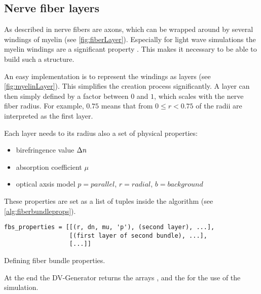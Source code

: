 \subsection{Nerve fiber layers}
%
As described in \dummy{} nerve fibers are axons, which can be wrapped around by several windings of myelin (see \cref{fig:fiberLayer}).
Especially for light wave simulations the myelin windings are a significant property \cite{MenzelDissertation}.
This makes it necessary to be able to build such a structure.
\par
%
An easy implementation is to represent the windings as layers (see \cref{fig:myelinLayer}).
This simplifies the creation process significantly.
A layer can then simply defined by a factor between $0$ and $1$, which scales with the nerve fiber radius.
For example, $0.75$ means that from $0 \leq r < 0.75$ of the radii are interpreted as the first layer.
\par
%
Each layer needs to its radius also a set of physical properties:
%
\begin{itemize}[nosep]
    \item birefringence value $\textnormal{$\Delta n$}$
    \item absorption coefficient $\mu$
    \item optical axsis model $p=\mathit{parallel}$, $r=\mathit{radial}$, $b=\mathit{background}$
\end{itemize}
%
These properties are set as a list of tuples inside the algorithm (see \cref{alg:fiberbundleprops}).
%
\begin{lstfloat}[!ht]
\lstset{style=python}
\begin{lstlisting}[]
fbs_properties = [[(r, dn, mu, 'p'), (second layer), ...],
                  [(first layer of second bundle), ...],
                  [...]]
\end{lstlisting}
\caption[Fiber bundle properties]{Defining fiber bundle properties.}
\label{alg:fiberbundleprops}
\end{lstfloat}
%
At the end the DV-Generator returns the arrays \tissue{}, \opticalaxis{} and the \propertylist{} for the use of the simulation.
%
